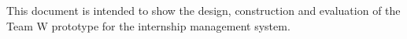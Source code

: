 This document is intended to show the design, construction and evaluation of the Team W prototype for the 
internship management system.